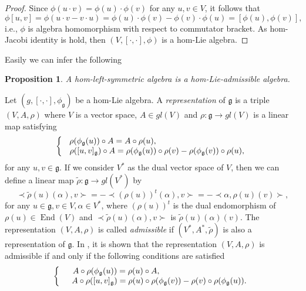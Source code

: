 \documentclass[10pt]{amsart}
\numberwithin{equation}{section}
\newtheorem{proposition}[theorem]{Proposition}
\begin{document}
\begin{proof}
Since $\phi(u\cdot v)=\phi(u)\cdot\phi(v)$ for any $u,v\in V$, it follows that
\[
\phi[u, v]=\phi(u\cdot v-v\cdot u)=\phi(u)\cdot\phi(v)-\phi(v)\cdot\phi(u)=[\phi(u), \phi(v)], 
\]
i.e., $\phi$ is algebra homomorphism with respect to commutator bracket. As hom-Jacobi identity is hold, then $(V, [\cdot ,\cdot ], \phi)$ is a hom-Lie algebra.
\end{proof}
Easily we can infer the following
\begin{proposition}\label{3.10}
A hom-left-symmetric algebra is a hom-Lie-admissible algebra.
\end{proposition}
Let $(g, [\cdot  , \cdot ], {\phi_\mathfrak{g}})$ be a hom-Lie algebra. A \textit{representation} of $\mathfrak{g}$ is a triple $(V, A, \rho)$ where $V$ is a vector space, $A\in gl(V)$ and 
$\rho: \mathfrak{g}\rightarrow gl(V)$ is a linear map satisfying
\begin{equation}\label{SS4}
\left\{
\begin{array}{cc}
&\hspace{-4cm}\rho(\phi_{\mathfrak{g}}(u))\circ A=A\circ \rho(u),\\
&\hspace{-.2cm}\rho([u,v]_{\mathfrak{g}})\circ A=\rho(\phi_{\mathfrak{g}}(u))\circ \rho(v)-\rho(\phi_{\mathfrak{g}}(v))\circ \rho(u),
\end{array}
\right.
\end{equation}
for any $u,v \in \mathfrak{g}$. If we consider $V^*$ as the dual vector
space of $V$, then we can define a linear map $\widetilde{\rho}:\mathfrak{g}\rightarrow gl(V^*)$ by 
\[
\prec\widetilde{\rho}(u)(\alpha),v\succ=-\prec({\rho}(u))^t(\alpha),v\succ=-\prec\alpha,\rho(u)(v)\succ,
\]
for any $u\in \mathfrak{g}, v\in V,  \alpha\in {V^*}$, where $(\rho(u))^t$ is the dual endomorphism of $\rho(u)\in\operatorname{End}(V)$ and $\prec\widetilde{\rho}(u)(\alpha),v\succ$ is $\widetilde{\rho}(u)(\alpha)(v)$. The representation $(V,A, \rho)$ is called \textit{admissible} if $(V ^*,A^*,\widetilde{\rho})$ is also a representation of $\mathfrak{g}$. In \cite{SB}, it is shown that the representation $(V, A, {\rho})$ is admissible if and only if 
the following conditions  are satisfied  
\begin{equation}\label{AM200}
\left\{
\begin{array}{cc}
&\hspace{-3.7cm}A\circ \rho(\phi_{\mathfrak{g}}(u))=\rho(u)\circ A,\\
&A\circ\rho([u,v]_\mathfrak{g})=\rho(u)\circ \rho(\phi_{\mathfrak{g}}(v))-\rho(v)\circ\rho(\phi_{\mathfrak{g}}(u)).
\end{array}
\right.
\end{equation}
\end{document}
